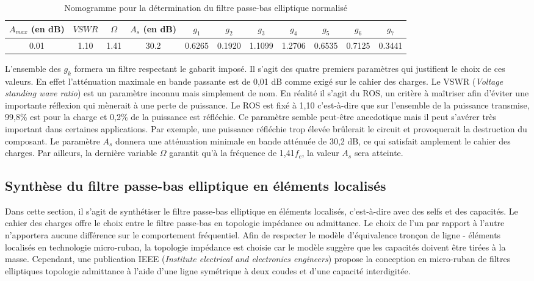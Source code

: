 \documentclass[french]{article}
\begin{document}
\begin{table}[H]
	\centering
	\begin{tabular}{|c|c|c|c|c|c|c|c|c|c|c|}
		\hline
		$A_{max}$ (en dB) & $VSWR$ & $\Omega$ & $A_s$ (en dB) & $g_1$ & $g_2$ & $g_3$ & $g_4$ & $g_5$ & $g_6$ & $g_7$\\
		\hline
		0.01 & 1.10 & 1.41 & 30.2 & 0.6265 & 0.1920 & 1.1099 & 1.2706 & 0.6535 & 0.7125 & 0.3441\\
		\hline
	\end{tabular}
	\caption{Nomogramme pour la détermination du filtre passe-bas elliptique normalisé}
	\label{tab:nomogramme_elliptique}
\end{table}

L'ensemble des $g_k$ formera un filtre respectant le gabarit imposé. Il s'agit des quatre premiers paramètres qui justifient le choix de ces valeurs. En effet l'atténuation maximale en bande passante est de 0,01 dB comme exigé sur le cahier des charges. Le VSWR (\textit{Voltage standing wave ratio}) est un paramètre inconnu mais simplement de nom. En réalité il s'agit du ROS, un critère à maîtriser afin d'éviter une importante réflexion qui mènerait à une perte de puissance. Le ROS est fixé à 1,10 c'est-à-dire que sur l'ensemble de la puissance transmise, 99,8\% est pour la charge et 0,2\% de la puissance est réfléchie. Ce paramètre semble peut-être anecdotique mais il peut s'avérer très important dans certaines applications. Par exemple, une puissance réfléchie trop élevée brûlerait le circuit et provoquerait la destruction du composant. Le paramètre $A_s$ donnera une atténuation minimale en bande atténuée de 30,2 dB, ce qui satisfait amplement le cahier des charges. Par ailleurs, la dernière variable $\Omega$ garantit qu'à la fréquence de 1,41$f_c$, la valeur $A_s$ sera atteinte.

\newpage

\subsection{Synthèse du filtre passe-bas elliptique en éléments localisés}

Dans cette section, il s'agit de synthétiser le filtre passe-bas elliptique en éléments localisés, c'est-à-dire avec des selfs et des capacités. Le cahier des charges offre le choix entre le filtre passe-bas en topologie impédance ou admittance. Le choix de l'un par rapport à l'autre n'apportera aucune différence sur le comportement fréquentiel. Afin de respecter le modèle d'équivalence tronçon de ligne - éléments localisés en technologie micro-ruban, la topologie impédance est choisie car le modèle suggère que les capacités doivent être tirées à la masse. Cependant, une publication IEEE (\textit{Institute electrical and electronics engineers}) propose la conception en micro-ruban de filtres elliptiques topologie admittance à l'aide d'une ligne symétrique à deux coudes et d'une capacité interdigitée.
\end{document}
